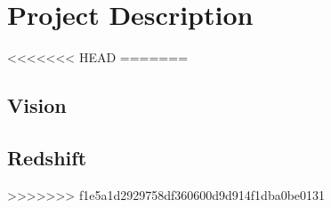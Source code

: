 \section{Project Description}
<<<<<<< HEAD
=======

\subsection{Vision}


\subsection{Redshift}
>>>>>>> f1e5a1d2929758df360600d9d914f1dba0be0131
